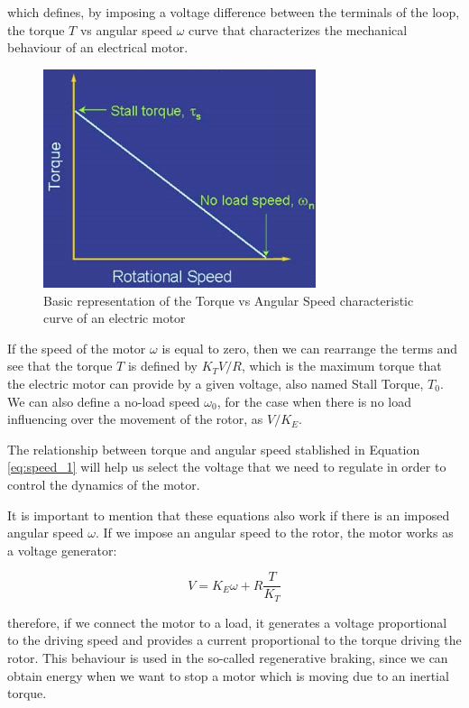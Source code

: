 which defines, by imposing a voltage difference between the terminals of the loop, the torque $T$ vs angular speed $\omega$ curve that characterizes the mechanical behaviour of an electrical motor.

\begin{figure}[htbp]
\centering
\includegraphics[width=8cm]{Images/torque_speed.png} 
\caption[Torque-Speed Curve]{Basic representation of the Torque vs Angular Speed characteristic curve of an electric motor}
\label{fig:torque_speed}
\end{figure}

If the speed of the motor $\omega$ is equal to zero, then we can rearrange the terms and see that the torque $T$ is defined by $K_{T}V/R$, which is the maximum torque that the electric motor can provide by a given voltage, also named Stall Torque, $T_{0}$. We can also define a no-load speed $\omega_{0}$, for the case when there is no load influencing over the movement of the rotor, as $V/K_{E}$.

The relationship between torque and angular speed stablished in Equation \ref{eq:speed_1} will help us select the voltage that we need to regulate in order to control the dynamics of the motor.

It is important to mention that these equations also work if there is an imposed angular speed $\omega$. If we impose an angular speed to the rotor, the motor works as a voltage generator:

\begin{equation} \label{eq:generator_1}
	V = K_{E} \omega + R\frac{T}{K_{T}}
\end{equation}

therefore, if we connect the motor to a load, it generates a voltage proportional to the driving speed and provides a current proportional to the torque driving the rotor. This behaviour is used in the so-called regenerative braking, since we can obtain energy when we want to stop a motor which is moving due to an inertial torque.

